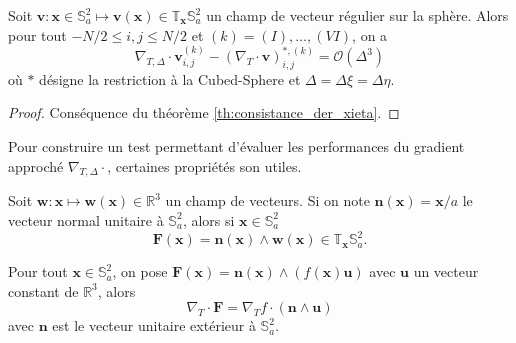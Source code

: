 \begin{proposition}
Soit $\mathbf{v} : \mathbf{x} \in \mathbb{S}_a^2 \mapsto \mathbf{v}(\mathbf{x}) \in \mathbb{T}_{\mathbf{x}} \mathbb{S}_a^2$ un champ de vecteur régulier sur la sphère. Alors pour tout $-N/2 \leq i,j \leq N/2$ et $(k) = (I) , \ldots , (VI)$, on a 
\begin{equation}
\nabla_{T,\Delta} \cdot \mathbf{v}_{i,j}^{(k)} - (\nabla_{T} \cdot \mathbf{v} )_{i,j}^{*,(k)} = \mathcal{O} \left( \Delta^3 \right)
\end{equation}
où $*$ désigne la restriction à la Cubed-Sphere et $\Delta  = \Delta \xi = \Delta \eta$.
\label{prop:accuracy_divergence}
\end{proposition}

\begin{proof}
Conséquence du théorème \ref{th:consistance_der_xieta}.
\end{proof}

Pour construire un test permettant d'évaluer les performances du gradient approché $\nabla_{T, \Delta} \cdot$, certaines propriétés son utiles.
\begin{lemme}
Soit $\mathbf{w} : \mathbf{x} \mapsto \mathbf{w}(\mathbf{x}) \in \mathbb{R}^3$ un champ de vecteurs. Si on note $ \mathbf{n}(\mathbf{x}) = \mathbf{x}/a$ le vecteur normal unitaire à $\mathbb{S}_a^2$, alors si $\mathbf{x} \in \mathbb{S}_a^2$
\begin{equation}
\mathbf{F}(\mathbf{x}) = \mathbf{n}(\mathbf{x}) \wedge \mathbf{w}(\mathbf{x}) \in \mathbb{T}_{\mathbf{x}} \mathbb{S}_a^2.
\end{equation}
\end{lemme}

\begin{proposition}
Pour tout $\mathbf{x} \in \mathbb{S}_a^2$, 
on pose $\mathbf{F}(\mathbf{x}) = \mathbf{n}(\mathbf{x}) \wedge (f (\mathbf{x}) \mathbf{u})$ 
avec $\mathbf{u}$ un vecteur constant de 
$\mathbb{R}^3$, alors
\begin{equation}
\nabla_T \cdot \mathbf{F} = \nabla_T f \cdot \left( \mathbf{n} \wedge \mathbf{u} \right)
\end{equation}
avec $\mathbf{n}$ est le vecteur unitaire extérieur à $\mathbb{S}_a^2$.
\label{prop:grad-div_link}
\end{proposition}


